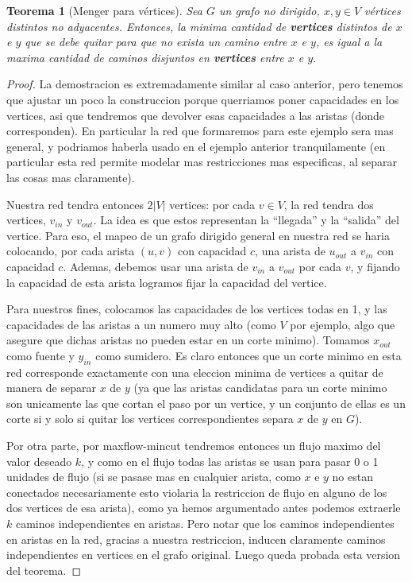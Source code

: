 \documentclass{article}
\newtheorem{teorema}{{\sc Teorema}}
\begin{document}
\begin{teorema}[Menger para vértices]
Sea $G$ un grafo no dirigido, $x,y \in V$ vértices distintos no adyacentes. Entonces, la minima cantidad de \textbf{vertices} distintos de $x$ e $y$ que se debe quitar para que no exista
un camino entre $x$ e $y$, es igual a la maxima cantidad de caminos disjuntos en \textbf{vertices} entre $x$ e $y$.
\end{teorema}
\begin{proof}
La demostracion es extremadamente similar al caso anterior, pero tenemos que ajustar un poco la construccion porque querriamos poner capacidades en
los vertices, asi que tendremos que devolver esas capacidades a las aristas (donde corresponden). En particular la red que formaremos para este
ejemplo sera mas general, y podriamos haberla usado en el ejemplo anterior tranquilamente (en particular esta red permite modelar mas restricciones
mas especificas, al separar las cosas mas claramente).

Nuestra red tendra entonces $2|V|$ vertices: por cada $v \in V$, la red tendra dos vertices, $v_{in}$  y $v_{out}$. La idea es que estos representan
la ``llegada'' y la ``salida'' del vertice. Para eso, el mapeo de un grafo dirigido general en nuestra red se haria colocando, por cada arista
$(u,v)$ con capacidad $c$, una arista de $u_{out}$ a $v_{in}$ con capacidad $c$. Ademas, debemos usar una arista de $v_{in}$ a $v_{out}$ por
cada $v$, y fijando la capacidad de esta arista logramos fijar la capacidad del vertice.

Para nuestros fines, colocamos las capacidades de los vertices todas en 1, y las capacidades de las aristas a un numero muy alto
(como $V$ por ejemplo, algo que asegure que dichas aristas no pueden estar en un corte minimo). Tomamos $x_{out}$ como fuente y
$y_{in}$ como sumidero. Es claro entonces que un corte minimo en esta red corresponde exactamente con una eleccion minima de vertices
a quitar de manera de separar $x$ de $y$ (ya que las aristas candidatas para un corte minimo son unicamente las que cortan el paso por
un vertice, y un conjunto de ellas es un corte si y solo si quitar los vertices correspondientes separa $x$ de $y$ en $G$).

Por otra parte, por maxflow-mincut tendremos entonces un flujo maximo del valor deseado $k$, y como en el flujo todas las aristas se usan
para pasar 0 o 1 unidades de flujo (si se pasase mas en cualquier arista, como $x$ e $y$ no estan conectados necesariamente esto violaria
la restriccion de flujo en alguno de los dos vertices de esa arista), como ya hemos argumentado antes podemos extraerle $k$ caminos
independientes en aristas. Pero notar que los caminos independientes en aristas en la red, gracias a nuestra restriccion, inducen claramente
caminos independientes en vertices en el grafo original. Luego queda probada esta version del teorema.
\end{proof}
\end{document}
